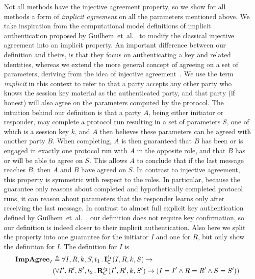 {%
Not all \mEdhoc{} methods have the injective agreement property, so we show
for all methods a form of \emph{implicit agreement} on all the parameters
mentioned above.
%
We take inspiration from the computational model definitions of implicit
authentication proposed by Guilhem~et~al.~\cite{DBLP:conf/csfw/GuilhemFW20} to
modify the classical injective agreement into an implicit property.
%
An important difference between our definition and theirs, is that they focus on
authenticating a key and related identities, whereas we extend the more general
concept of agreeing on a set of parameters, deriving from the idea of injective
agreement~\cite{DBLP:conf/csfw/Lowe97a}.
%
We use the term \emph{implicit} in this context to refer to that a party
accepts any other party who knows the session key material as the
authenticated party, and that party (if honest) will also agree on the
parameters computed by the protocol.
%
The intuition behind our definition is that a party $A$, being either initiator
or responder, may complete a protocol
run resulting in a set of parameters $S$, one of which is a session key $k$,
and $A$ then believes these parameters can be agreed with another party $B$.
%
When completing, $A$ is then guaranteed that $B$ has been or is
engaged in exactly one protocol run with $A$ in the opposite role, and that $B$
has or will be able to agree on $S$.
%
This allows $A$ to conclude that if the last message reaches $B$, then
$A$ and $B$ have agreed on $S$.
%
In contrast to injective agreement, this property is symmetric with respect to
the roles.
%
In particular, because the guarantee only reasons about completed and
hypothetically completed protocol runs, it can reason about parameters that the
responder learns only after receiving the last message.
%
In contrast to almost full explicit key authentication defined by
Guilhem~et~al.~\cite{DBLP:conf/csfw/GuilhemFW20}, our definition does not
require key confirmation, so our definition is indeed closer to their implicit
authentication.
%
Also here we split the property into one guarantee for the initiator $I$ and
one for $R$, but only show the definition for $I$.
%
The definition for $I$ is
\begin{align*}
    \mPredImpI& \triangleq
    \forall I, R, k, S, t_1\mLogicDot \mIComplete^{t_1}(I, R, k, S)
    \rightarrow\\
      &(\forall I', R', S', t_2\mLogicDot \mRComplete^{t_2}(I', R', k, S') \rightarrow
             (I=I' \land R=R' \land S=S'))\\

\end{align*}}
